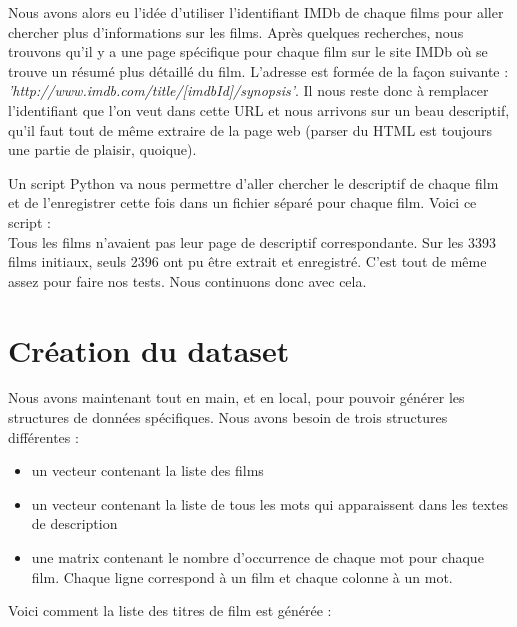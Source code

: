 Nous avons alors eu l'idée d'utiliser l'identifiant IMDb de chaque films pour aller chercher plus d'informations sur les films. Après quelques recherches, nous trouvons qu'il y a une page spécifique pour chaque film sur le site IMDb où se trouve un résumé plus détaillé du film. L'adresse est formée de la façon suivante : \textit{'http://www.imdb.com/title/[imdbId]/synopsis'}. Il nous reste donc à remplacer l'identifiant que l'on veut dans cette URL et nous arrivons sur un beau descriptif, qu'il faut tout de même extraire de la page web (parser du HTML est toujours une partie de plaisir, quoique).

Un script Python va nous permettre d'aller chercher le descriptif de chaque film et de l'enregistrer cette fois dans un fichier séparé pour chaque film. Voici ce script : \\



Tous les films n'avaient pas leur page de descriptif correspondante. Sur les 3393 films initiaux, seuls 2396 ont pu être extrait et enregistré. C'est tout de même assez pour faire nos tests. Nous continuons donc avec cela.

\section{Création du dataset}

Nous avons maintenant tout en main, et en local, pour pouvoir générer les structures de données spécifiques. Nous avons besoin de trois structures différentes :

\begin{itemize}
 \item un vecteur contenant la liste des films
 \item un vecteur contenant la liste de tous les mots qui apparaissent dans les textes de description 
 \item une matrix contenant le nombre d'occurrence de chaque mot pour chaque film. Chaque ligne correspond à un film et chaque colonne à un mot.
\end{itemize}

\vspace{0.4cm}
%
Voici comment la liste des titres de film est générée : \\

